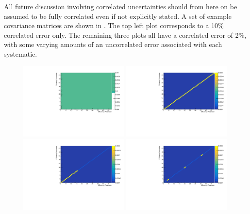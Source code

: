 All future discussion involving correlated uncertainties should from here on be assumed to be fully correlated even if not explicitly stated. A set of example covariance matrices are shown in . The top left plot corresponds to a 10\% correlated error only. The remaining three plots all have a correlated error of 2\%, with some varying amounts of an uncorrelated error associated with each systematic. 

\begin{figure}[h!]
    \centering
    \includegraphics[width = 0.49\textwidth]{figures-chap5/efficiency_matrices/efficiency_error_matrix_48x48_type1_cor10.00pct.root.pdf}
    \includegraphics[width = 0.49\textwidth]{figures-chap5/efficiency_matrices/efficiency_error_matrix_48x48_type2_cor2.00pct_sbnduncor1.00pct_ubooneuncor1.00pct_icarusuncor1.00pct.root.pdf}
    \includegraphics[width = 0.49\textwidth]{figures-chap5/efficiency_matrices/efficiency_error_matrix_48x48_type2_cor2.00pct_sbnduncor2.00pct_ubooneuncor0.50pct_icarusuncor0.50pct.root.pdf}
    \includegraphics[width = 0.49\textwidth]{figures-chap5/efficiency_matrices/efficiency_error_matrix_48x48_type3_cor2.00pct_bulkuncor0.50pct_allpeakEnumuCCuncor2.00pct.root.pdf}

\end{figure}
